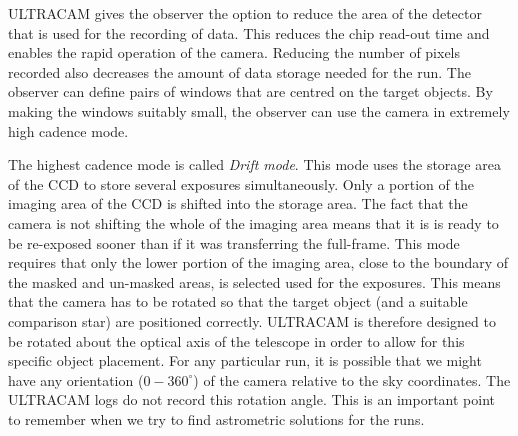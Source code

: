 ULTRACAM gives the observer the option to reduce the area of the detector that is used for the recording of data. This reduces the chip read-out time and enables the rapid operation of the camera. Reducing the number of pixels recorded also decreases the amount of data storage needed for the run. The observer can define pairs of windows that are centred on the target objects. By making the windows suitably small, the observer can use the camera in extremely high cadence mode. 

The highest cadence mode is called \emph{Drift mode}. This mode uses the storage area of the CCD to store several exposures simultaneously. Only a portion of the imaging area of the CCD is shifted into the storage area. The fact that the camera is not shifting the whole of the imaging area means that it is is ready to be re-exposed sooner than if it was transferring the full-frame. This mode requires that only the lower portion of the imaging area, close to the boundary of the masked and un-masked areas, is selected used for the exposures. This means that the camera has to be rotated so that the target object (and a suitable comparison star) are positioned correctly. ULTRACAM is therefore designed to be rotated about the optical axis of the telescope in order to allow for this specific object placement. For any particular run, it is possible that we might have any orientation ($0-360^{\circ}$) of the camera relative to the sky coordinates. The ULTRACAM logs do not record this rotation angle. This is an important point to remember when we try to find astrometric solutions for the runs.    

